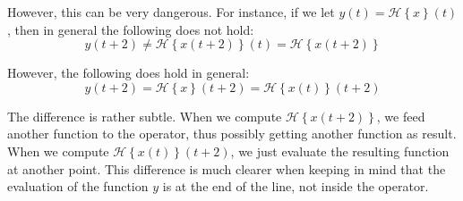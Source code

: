 \documentclass[a4paper]{article}
\begin{document}
{{       However, this can be very dangerous. For instance, if we let $y\left(t\right) = \mathcal{H}\left\{x\right\}\left(t\right)$, then in general the following does not hold: 
       \[y\left(t+2\right) \neq \mathcal{H}\left\{x\left(t + 2\right)\right\}\left(t\right) = \mathcal{H}\left\{x\left(t+2\right)\right\}\]

       However, the following does hold in general: 
       \[y\left(t+2\right) = \mathcal{H}\left\{x\right\}\left(t+2\right) = \mathcal{H}\left\{x\left(t\right)\right\}\left(t+2\right)\]
       
       The difference is rather subtle. When we compute $\mathcal{H}\left\{x\left(t+2\right)\right\}$, we feed another function to the operator, thus possibly getting another function as result. When we compute $\mathcal{H}\left\{x\left(t\right)\right\}\left(t+2\right)$, we just evaluate the resulting function at another point. This difference is much clearer when keeping in mind that the evaluation of the function $y$ is at the end of the line, not inside the operator.
   }
}

\end{document}
